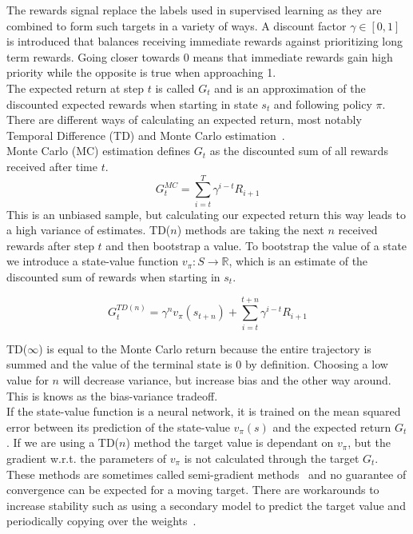 \documentclass{article}
\begin{document}
\noindent The rewards signal replace the labels used in supervised learning as they are
combined to form such targets in a variety of ways. A discount factor $\gamma \in [0,1]$ is introduced that
balances receiving immediate rewards against prioritizing long term rewards. Going closer towards 0 means
that immediate rewards gain high priority while the opposite is true when approaching 1.\\
The expected return at step $t$ is called $G_t$ and is an approximation of the discounted
expected rewards when starting in state $s_t$ and following policy $\pi$.
There are different ways of calculating an expected return, most notably Temporal Difference (TD) and Monte Carlo estimation~\cite{Sutton1998}.\\
Monte Carlo (MC) estimation defines $G_t$ as the discounted sum of all rewards received after time $t$.
\begin{equation}
    G_t^{MC} = \sum_{i=t}^T \gamma^{i-t} R_{i+1}
\end{equation}
This is an unbiased sample, but calculating our expected return this way leads to a
high variance of estimates.
TD($n$) methods are taking the next $n$ received rewards after step $t$ and then 
bootstrap a value. To bootstrap
the value of a state we introduce a state-value function $v_\pi : S \xrightarrow{} \mathbb{R}$, which
is an estimate of the discounted sum of rewards when starting in $s_t$.

\begin{equation}
    G_t^{TD(n)} = \gamma^n v_\pi(s_{t+n}) + \sum_{i=t}^{t+n} \gamma^{i-t} R_{i+1}  
\end{equation}

\noindent TD($\infty$) is equal to the Monte Carlo return because the entire trajectory is summed and
the value of the terminal state is 0 by definition.
Choosing a low value for $n$ will decrease variance, but increase bias and the other way around.
This is knows as the bias-variance tradeoff.\\
If the state-value function is a neural network, it is trained on the mean squared error between
its prediction of the state-value $v_\pi(s)$ and the expected return $G_t$. If we are using a TD($n$) method the target
value is dependant on $v_\pi$, but the gradient w.r.t. the parameters of $v_\pi$ is not calculated through the target $G_t$. 
These methods are sometimes called semi-gradient methods~\cite{Sutton1998} and
no guarantee of convergence can be expected for a moving target.
There are workarounds to increase stability such as using a secondary model to predict
the target value and periodically copying over the weights~\cite{hessel2017rainbow}.\\
\end{document}
